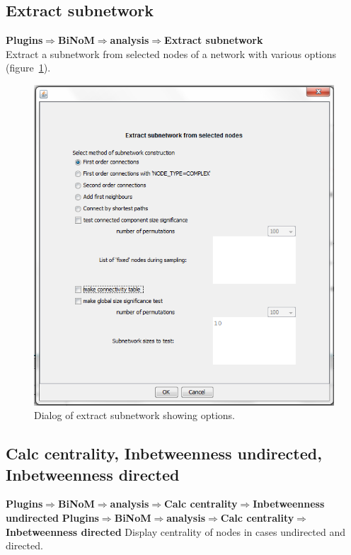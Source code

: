 \subsection{Extract subnetwork}
\textbf{Plugins$\Rightarrow$BiNoM$\Rightarrow$analysis$\Rightarrow$Extract subnetwork}\\
Extract a subnetwork from selected nodes of a network with various options (figure~\ref{Extract_subnetwork_dialog}).
\begin{figure}
\centering
\includegraphics[width=14 cm]{graphics/Extract_subnetwork_dialog}
\caption{Dialog of extract subnetwork showing options.}
\label{Extract_subnetwork_dialog}
\end{figure}

\subsection{Calc centrality, Inbetweenness undirected, Inbetweenness directed}
\textbf{Plugins$\Rightarrow$BiNoM$\Rightarrow$analysis$\Rightarrow$Calc centrality$\Rightarrow$Inbetweenness undirected}
\textbf{Plugins$\Rightarrow$BiNoM$\Rightarrow$analysis$\Rightarrow$Calc centrality$\Rightarrow$Inbetweenness directed}
Display centrality of nodes in cases undirected and directed.

